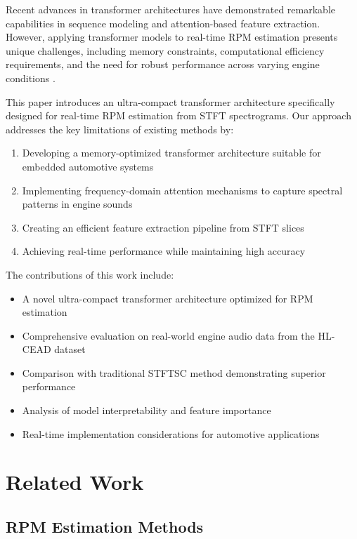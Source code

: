 \documentclass[journal,10pt]{IEEEtran}
\begin{document}
Recent advances in transformer architectures \cite{transformer} have demonstrated remarkable capabilities in sequence modeling and attention-based feature extraction. However, applying transformer models to real-time RPM estimation presents unique challenges, including memory constraints, computational efficiency requirements, and the need for robust performance across varying engine conditions \cite{RNN1}.

This paper introduces an ultra-compact transformer architecture specifically designed for real-time RPM estimation from STFT spectrograms. Our approach addresses the key limitations of existing methods by:

\begin{enumerate}
    \item Developing a memory-optimized transformer architecture suitable for embedded automotive systems
    \item Implementing frequency-domain attention mechanisms to capture spectral patterns in engine sounds
    \item Creating an efficient feature extraction pipeline from STFT slices
    \item Achieving real-time performance while maintaining high accuracy
\end{enumerate}

The contributions of this work include:

\begin{itemize}
    \item A novel ultra-compact transformer architecture optimized for RPM estimation
    \item Comprehensive evaluation on real-world engine audio data from the HL-CEAD dataset
    \item Comparison with traditional STFTSC method demonstrating superior performance
    \item Analysis of model interpretability and feature importance
    \item Real-time implementation considerations for automotive applications
\end{itemize}

\section{Related Work}

\subsection{RPM Estimation Methods}
\end{document}

